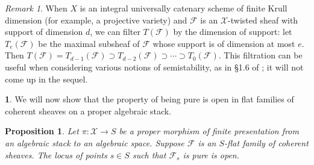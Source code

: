 \documentclass[11pt]{amsart}
\newcommand{\ms}[1]{\mathscr #1}
\renewcommand{\[}{[\!\hspace{0.03em}[}
\renewcommand{\]}{]\!\hspace{0.03em}]}
\renewcommand{\(}{(\!\hspace{0.03em}(}
\renewcommand{\)}{)\!\hspace{0.03em})}
\newtheorem{prop}[lem]{Proposition}
\theoremstyle{definition}
\newtheorem{para}[lem]{\indent}
\theoremstyle{remark}
\newtheorem{remark}[lem]{Remark}
\begin{document}
\begin{remark} When $X$ is an integral universally catenary scheme of 
finite Krull dimension (for example, a 
projective variety) and $\ms F$ is an $\ms X$-twisted sheaf with 
support of dimension $d$, we can filter $T(\ms F)$ by the dimension of 
support: let $T_{e}(\ms F)$ be the maximal subsheaf of $\ms F$ whose 
support is of dimension at most $e$.  Then $T(\ms F)=T_{d-1}(\ms 
F)\supset T_{d-2}(\ms F)\supset\cdots\supset T_{0}(\ms F)$.  This 
filtration can be useful when considering various notions of 
semistability, as in \S 1.6 of \cite{h-l}; it will not come up in the sequel.
\end{remark}

\begin{para} We will now show that the property of being pure is open 
in flat families of coherent sheaves on a proper algebraic stack.  
\end{para}
\begin{prop} Let $\pi:\ms X\to S$ be a proper morphism of finite 
presentation from an algebraic stack to an algebraic space.  Suppose $\ms F$ is an $S$-flat family of coherent sheaves.  
The locus of points $s\in S$ such that $\ms F_{s}$ is pure is open. 
\end{prop}
\end{document}

